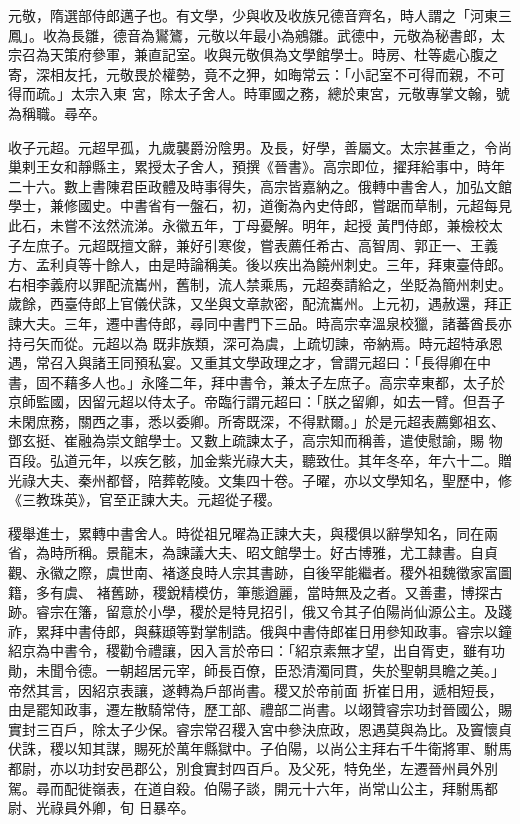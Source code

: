 \begin{pinyinscope}
 元敬，隋選部侍郎邁子也。有文學，少與收及收族兄德音齊名，時人謂之「河東三鳳」。收為長雛，德音為鸑鷟，元敬以年最小為鵷雛。武德中，元敬為秘書郎，太宗召為天策府參軍，兼直記室。收與元敬俱為文學館學士。時房、杜等處心腹之寄，深相友托，元敬畏於權勢，竟不之狎，如晦常云：「小記室不可得而親，不可得而疏。」太宗入東
 宮，除太子舍人。時軍國之務，總於東宮，元敬專掌文翰，號為稱職。尋卒。



 收子元超。元超早孤，九歲襲爵汾陰男。及長，好學，善屬文。太宗甚重之，令尚巢剌王女和靜縣主，累授太子舍人，預撰《晉書》。高宗即位，擢拜給事中，時年二十六。數上書陳君臣政體及時事得失，高宗皆嘉納之。俄轉中書舍人，加弘文館學士，兼修國史。中書省有一盤石，初，道衡為內史侍郎，嘗踞而草制，元超每見此石，未嘗不泫然流涕。永徽五年，丁母憂解。明年，起授
 黃門侍郎，兼檢校太子左庶子。元超既擅文辭，兼好引寒俊，嘗表薦任希古、高智周、郭正一、王義方、孟利貞等十餘人，由是時論稱美。後以疾出為饒州刺史。三年，拜東臺侍郎。右相李義府以罪配流巂州，舊制，流人禁乘馬，元超奏請給之，坐貶為簡州刺史。歲餘，西臺侍郎上官儀伏誅，又坐與文章款密，配流巂州。上元初，遇赦還，拜正諫大夫。三年，遷中書侍郎，尋同中書門下三品。時高宗幸溫泉校獵，諸蕃酋長亦持弓矢而從。元超以為
 既非族類，深可為虞，上疏切諫，帝納焉。時元超特承恩遇，常召入與諸王同預私宴。又重其文學政理之才，曾謂元超曰：「長得卿在中書，固不藉多人也。」永隆二年，拜中書令，兼太子左庶子。高宗幸東都，太子於京師監國，因留元超以侍太子。帝臨行謂元超曰：「朕之留卿，如去一臂。但吾子未閑庶務，關西之事，悉以委卿。所寄既深，不得默爾。」於是元超表薦鄭祖玄、鄧玄挺、崔融為崇文館學士。又數上疏諫太子，高宗知而稱善，遣使慰諭，賜
 物百段。弘道元年，以疾乞骸，加金紫光祿大夫，聽致仕。其年冬卒，年六十二。贈光祿大夫、秦州都督，陪葬乾陵。文集四十卷。子曜，亦以文學知名，聖歷中，修《三教珠英》，官至正諫大夫。元超從子稷。



 稷舉進士，累轉中書舍人。時從祖兄曜為正諫大夫，與稷俱以辭學知名，同在兩省，為時所稱。景龍末，為諫議大夫、昭文館學士。好古博雅，尤工隸書。自貞觀、永徽之際，虞世南、褚遂良時人宗其書跡，自後罕能繼者。稷外祖魏徵家富圖籍，多有虞、
 褚舊跡，稷銳精模仿，筆態遒麗，當時無及之者。又善畫，博探古跡。睿宗在籓，留意於小學，稷於是特見招引，俄又令其子伯陽尚仙源公主。及踐祚，累拜中書侍郎，與蘇頲等對掌制誥。俄與中書侍郎崔日用參知政事。睿宗以鐘紹京為中書令，稷勸令禮讓，因入言於帝曰：「紹京素無才望，出自胥吏，雖有功勛，未聞令德。一朝超居元宰，師長百僚，臣恐清濁同貫，失於聖朝具瞻之美。」帝然其言，因紹京表讓，遂轉為戶部尚書。稷又於帝前面
 折崔日用，遞相短長，由是罷知政事，遷左散騎常侍，歷工部、禮部二尚書。以翊贊睿宗功封晉國公，賜實封三百戶，除太子少保。睿宗常召稷入宮中參決庶政，恩遇莫與為比。及竇懷貞伏誅，稷以知其謀，賜死於萬年縣獄中。子伯陽，以尚公主拜右千牛衛將軍、駙馬都尉，亦以功封安邑郡公，別食實封四百戶。及父死，特免坐，左遷晉州員外別駕。尋而配徙嶺表，在道自殺。伯陽子談，開元十六年，尚常山公主，拜駙馬都尉、光祿員外卿，旬
 日暴卒。




\end{pinyinscope}
